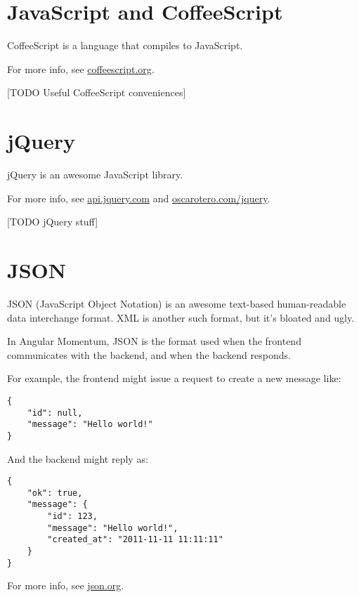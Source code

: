 \documentclass[12pt]{article}
\begin{document}
\newpage
\section{JavaScript and CoffeeScript}
CoffeeScript is a language that compiles to JavaScript.

For more info, see \url{coffeescript.org}.

[TODO Useful CoffeeScript conveniences]

\section{jQuery}
jQuery is an awesome JavaScript library.

For more info, see \url{api.jquery.com} and \url{oscarotero.com/jquery}.

[TODO jQuery stuff]

\section{JSON}
JSON (JavaScript Object Notation) is an awesome text-based human-readable data interchange format. XML is another such format, but it's bloated and ugly.

In Angular Momentum, JSON is the format used when the frontend communicates with the backend, and when the backend responds.

For example, the frontend might issue a request to create a new message like:
\begin{verbatim}
{
    "id": null,
    "message": "Hello world!"
}
\end{verbatim}

And the backend might reply as:
\begin{verbatim}
{
    "ok": true,
    "message": {
        "id": 123,
        "message": "Hello world!",
        "created_at": "2011-11-11 11:11:11"
    }
}
\end{verbatim}



For more info, see \url{json.org}.
\end{document}
